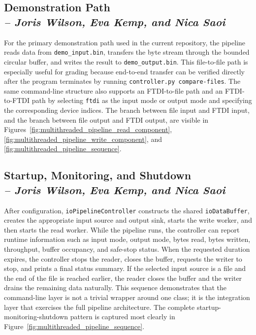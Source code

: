 \subsection{Demonstration Path \\
\small{\textit{-- Joris Wilson, Eva Kemp, and Nica Saoi}}}
\label{Section::Demonstration Path}

For the primary demonstration path used in the current repository, the pipeline reads data from \texttt{demo\_input.bin}, transfers the byte stream through the bounded circular buffer, and writes the result to \texttt{demo\_output.bin}. This file-to-file path is especially useful for grading because end-to-end transfer can be verified directly after the program terminates by running \texttt{controller.py compare-files}. The same command-line structure also supports an FTDI-to-file path and an FTDI-to-FTDI path by selecting \texttt{ftdi} as the input mode or output mode and specifying the corresponding device indices. The branch between file input and FTDI input, and the branch between file output and FTDI output, are visible in Figures~\ref{fig:multithreaded_pipeline_read_component}, \ref{fig:multithreaded_pipeline_write_component}, and \ref{fig:multithreaded_pipeline_sequence}.

\subsection{Startup, Monitoring, and Shutdown \\
\small{\textit{-- Joris Wilson, Eva Kemp, and Nica Saoi}}}
\label{Section::Startup, Monitoring, and Shutdown}

After configuration, \texttt{ioPipelineController} constructs the shared \texttt{ioDataBuffer}, creates the appropriate input source and output sink, starts the write worker, and then starts the read worker. While the pipeline runs, the controller can report runtime information such as input mode, output mode, bytes read, bytes written, throughput, buffer occupancy, and safe-stop status. When the requested duration expires, the controller stops the reader, closes the buffer, requests the writer to stop, and prints a final status summary. If the selected input source is a file and the end of the file is reached earlier, the reader closes the buffer and the writer drains the remaining data naturally. This sequence demonstrates that the command-line layer is not a trivial wrapper around one class; it is the integration layer that exercises the full pipeline architecture. The complete startup-monitoring-shutdown pattern is captured most clearly in Figure~\ref{fig:multithreaded_pipeline_sequence}.

